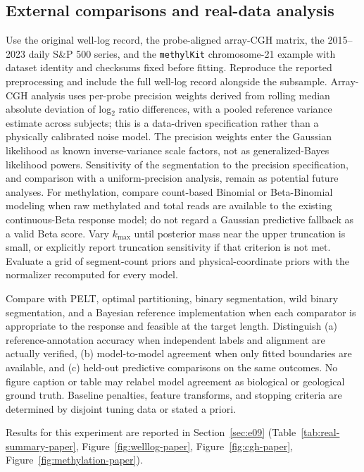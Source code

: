 \subsection{External comparisons and real-data analysis}
Use the original well-log record, the probe-aligned array-CGH matrix, the
2015--2023 daily S\&P 500 series, and the \texttt{methylKit} chromosome-21
example with dataset identity and checksums fixed before fitting. Reproduce
the reported preprocessing and include the full well-log record alongside the
subsample. Array-CGH analysis uses per-probe precision weights derived from rolling median absolute deviation of log$_2$ ratio differences, with a pooled reference variance estimate across subjects; this is a data-driven specification rather than a physically calibrated noise model. The precision weights enter the Gaussian likelihood as known inverse-variance scale factors, not as generalized-Bayes likelihood powers. Sensitivity of the segmentation to the precision specification, and comparison with a uniform-precision analysis, remain as potential future analyses.
For methylation, compare count-based Binomial or Beta-Binomial modeling when
raw methylated and total reads are available to the existing continuous-Beta
response model; do not regard a Gaussian predictive fallback as a valid Beta
score. Vary $k_{\max}$ until posterior mass near the upper truncation is
small, or explicitly report truncation sensitivity if that criterion is not
met. Evaluate a grid of segment-count priors and physical-coordinate priors
with the normalizer recomputed for every model.

Compare with PELT, optimal partitioning, binary segmentation, wild binary
segmentation, and a Bayesian reference implementation when each comparator is
appropriate to the response and feasible at the target length. Distinguish
(a) reference-annotation accuracy when independent labels and alignment are
actually verified, (b) model-to-model agreement when only fitted boundaries
are available, and (c) held-out predictive comparisons on the same outcomes.
No figure caption or table may relabel model agreement as biological or
geological ground truth. Baseline penalties, feature transforms, and stopping
criteria are determined by disjoint tuning data or stated a priori.

Results for this experiment are reported in Section~\ref{sec:e09}
(Table~\ref{tab:real-summary-paper}, Figure~\ref{fig:welllog-paper},
Figure~\ref{fig:cgh-paper}, Figure~\ref{fig:methylation-paper}).

